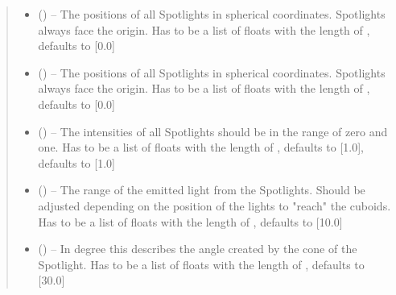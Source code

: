 \documentclass[letterpaper,10pt,english]{sphinxmanual}
\begin{document}
\begin{fulllineitems}
\begin{fulllineitems}
\begin{quote}
\begin{description}
\begin{itemize}
\item {} 
 (\sphinxstyleliteralemphasis{\sphinxupquote{, }}) -- The positions of all Spotlights in spherical coordinates. Spotlights always face the origin. Has to be a list of floats with the length of , defaults to {[}0.0{]}

\item {} 
 (\sphinxstyleliteralemphasis{\sphinxupquote{, }}) -- The positions of all Spotlights in spherical coordinates. Spotlights always face the origin. Has to be a list of floats with the length of , defaults to {[}0.0{]}

\item {} 
 (\sphinxstyleliteralemphasis{\sphinxupquote{, }}) -- The intensities of all Spotlights should be in the range of zero and one. Has to be a list of floats with the length of , defaults to {[}1.0{]}, defaults to {[}1.0{]}

\item {} 
 (\sphinxstyleliteralemphasis{\sphinxupquote{, }}) -- The range of the emitted light from the Spotlights. Should be adjusted depending on the position of the lights to "reach" the cuboids. Has to be a list of floats with the length of , defaults to {[}10.0{]}

\item {} 
 (\sphinxstyleliteralemphasis{\sphinxupquote{, }}) -- In degree this describes the angle created by the cone of the Spotlight. Has to be a list of floats with the length of , defaults to {[}30.0{]}

\end{itemize}


\end{description}
\end{quote}
\end{fulllineitems}
\end{fulllineitems}
\end{document}
